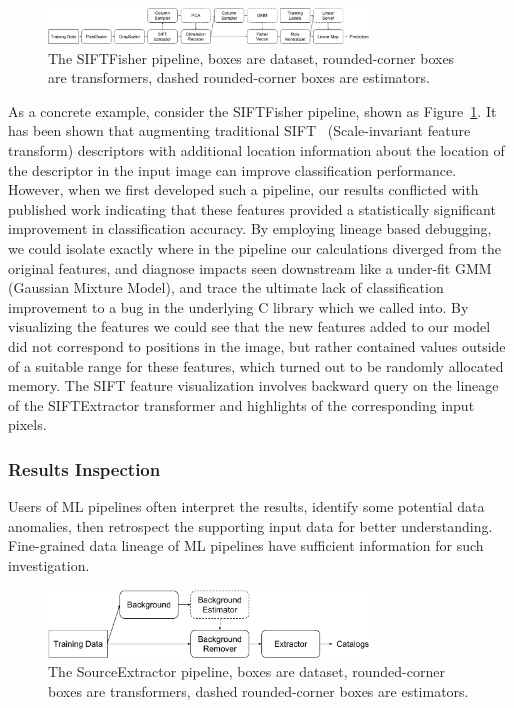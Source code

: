 \documentclass{sig-alternate}
\begin{document}
\begin{figure}[ht]
\begin{center}
    \includegraphics[width=85mm]{pictures/VOCSIFTFisher}
    \caption {The SIFTFisher pipeline, boxes are dataset, rounded-corner boxes are transformers, dashed rounded-corner boxes are estimators.
    \label{fig:vocsiftfisher}
}
\end{center}
\end{figure}

As a concrete example, consider the SIFTFisher pipeline, shown as Figure~\ref{fig:vocsiftfisher}. 
It has been shown that augmenting traditional SIFT~\cite{lowe99} (Scale-invariant feature transform) descriptors with additional location information about the location of the descriptor in the input image can improve classification performance.
However, when we first developed such a pipeline, our results conflicted with published work indicating that these features provided a statistically significant improvement in classification accuracy.
By employing lineage based debugging, we could isolate exactly where in the pipeline our calculations diverged from the original features, and diagnose impacts seen downstream like a under-fit GMM (Gaussian Mixture Model), and trace the ultimate lack of classification improvement to a bug in the underlying C library which we called into.
By visualizing the features we could see that the new features added to our model did not correspond to positions in the image, but rather contained values outside of a suitable range for these features, which turned out to be randomly allocated memory. The SIFT feature visualization involves backward query on the lineage of the SIFTExtractor transformer and highlights of the corresponding input pixels.


\subsubsection{Results Inspection}
Users of ML pipelines often interpret the results, identify some potential data anomalies, then retrospect the supporting input data for better understanding.
Fine-grained data lineage of ML pipelines have sufficient information for such investigation.

\begin{figure}[h]
\begin{center}
    \includegraphics[width=85mm]{pictures/SourceExtractor}
    \caption {The SourceExtractor pipeline, boxes are dataset, rounded-corner boxes are transformers, dashed rounded-corner boxes are estimators.
    \label{fig:sourceextractor}
}
\end{center}
\end{figure}
\end{document}
